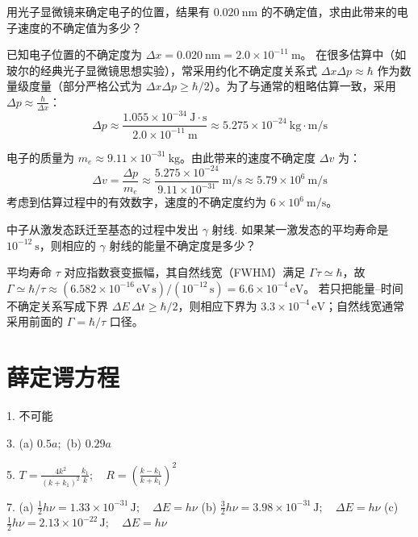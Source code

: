 \begin{exercise}\label{ex:23.9}
用光子显微镜来确定电子的位置，结果有 $0.020 \ \mathrm{nm}$ 的不确定值，求由此带来的电子速度的不确定值为多少？
\end{exercise}
\begin{solution}
已知电子位置的不确定度为 $\Delta x = 0.020 \ \mathrm{nm} = 2.0 \times 10^{-11} \ \mathrm{m}$。
在很多估算中（如玻尔的经典光子显微镜思想实验），常采用约化不确定度关系式 $\Delta x \Delta p \approx \hbar$ 作为数量级度量（部分严格公式为 $\Delta x \Delta p \ge \hbar/2$）。为了与通常的粗略估算一致，采用 $\Delta p \approx \frac{\hbar}{\Delta x}$：
$$ \Delta p \approx \frac{1.055 \times 10^{-34} \ \mathrm{J \cdot s}}{2.0 \times 10^{-11} \ \mathrm{m}} \approx 5.275 \times 10^{-24} \ \mathrm{kg \cdot m/s} $$

电子的质量为 $m_e \approx 9.11 \times 10^{-31} \ \mathrm{kg}$。由此带来的速度不确定度 $\Delta v$ 为：
$$ \Delta v = \frac{\Delta p}{m_e} \approx \frac{5.275 \times 10^{-24}}{9.11 \times 10^{-31}} \ \mathrm{m/s} \approx 5.79 \times 10^6 \ \mathrm{m/s} $$
考虑到估算过程中的有效数字，速度的不确定度约为 $6 \times 10^6 \ \mathrm{m/s}$。
\end{solution}

\begin{exercise}\label{ex:23.10}
中子从激发态跃迁至基态的过程中发出 $\gamma$ 射线. 如果某一激发态的平均寿命是 $10^{-12} \ \mathrm{s}$，则相应的 $\gamma$ 射线的能量不确定度是多少？
\end{exercise}
\begin{solution}
平均寿命 $\tau$ 对应指数衰变振幅，其自然线宽（FWHM）满足 $\Gamma\tau\simeq\hbar$，故
$\boxed{\Gamma\simeq\hbar/\tau}\approx(6.582\times10^{-16}\,\mathrm{eV\,s})/(10^{-12}\,\mathrm s)=6.6\times10^{-4}\,\mathrm{eV}$。
若只把能量--时间不确定关系写成下界 $\Delta E\,\Delta t\ge\hbar/2$，则相应下界为 $3.3\times10^{-4}\,\mathrm{eV}$；自然线宽通常采用前面的 $\Gamma=\hbar/\tau$ 口径。
\end{solution}



\chapter{薛定谔方程}

\begin{oddanswers}
1. 不可能

3. (a) $0.5a;$ (b) $0.29a$

5. $T = \frac{4k^2}{(k + k_1)^2} \frac{k_1}{k}; \quad R = \left(\frac{k - k_1}{k + k_1}\right)^2$

7. (a) $\frac{1}{2}h\nu = 1.33 \times 10^{-31}\,\mathrm{J}; \quad \Delta E = h\nu$
(b) $\frac{3}{2}h\nu = 3.98 \times 10^{-31}\,\mathrm{J}; \quad \Delta E = h\nu$
(c) $\frac{1}{2}h\nu = 2.13 \times 10^{-22}\,\mathrm{J}; \quad \Delta E = h\nu$
\end{oddanswers}

